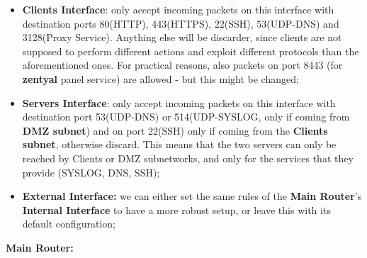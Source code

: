\begin{itemize}
\item \textbf{Clients Interface}: only accept incoming packets on this interface with destination ports 80(HTTP), 443(HTTPS), 22(SSH), 53(UDP-DNS) and 3128(Proxy Service). Anything else will be discarder, since clients are not supposed to perform different actions and exploit different protocols than the aforementioned ones. For practical reasons, also packets on port 8443 (for \textbf{zentyal} panel service) are allowed - but this might be changed;
\item \textbf{Servers Interface}: only accept incoming packets on this interface with destination port 53(UDP-DNS) or 514(UDP-SYSLOG, only if coming from \textbf{DMZ subnet}) and on port 22(SSH) only if coming from the \textbf{Clients subnet}, otherwise discard. This means that the two servers can only be reached by Clients or DMZ subnetworks, and only for the services that they provide (SYSLOG, DNS, SSH);
\item \textbf{External Interface:} we can either set the same rules of the \textbf{Main Router}'s \textbf{Internal Interface} to have a more robust setup, or leave this with its default configuration;
\end{itemize}
\textbf{Main Router:}
